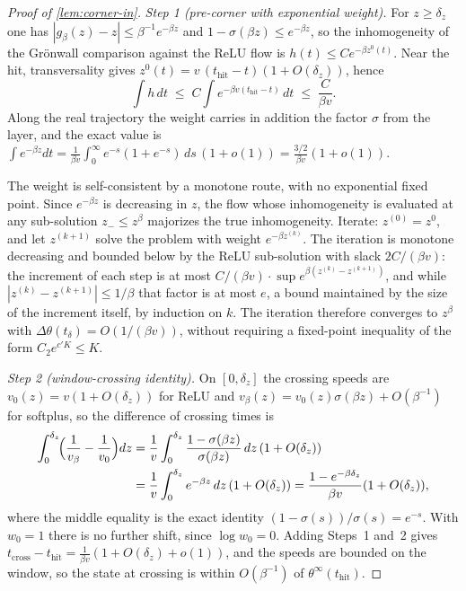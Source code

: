 \documentclass[11pt]{article}
\theoremstyle{definition}
\theoremstyle{remark}
\newcommand{\thit}{t_{\mathrm{hit}}}
\begin{document}
\begin{proof}[Proof of \cref{lem:corner-in}]
\emph{Step 1 (pre-corner with exponential weight).} For $z\ge\delta_z$ one has
$|g_\beta(z)-z|\le\beta^{-1}e^{-\beta z}$ and $1-\sigma(\beta z)\le e^{-\beta z}$,
so the inhomogeneity of the Gr\"onwall comparison against the ReLU flow is
$h(t)\le Ce^{-\beta z^0(t)}$. Near the hit, transversality gives
$z^0(t)=v\,(\thit-t)(1+O(\delta_z))$, hence
\[
\int h\,dt\;\le\;C\!\int e^{-\beta v(\thit-t)}\,dt\;\le\;\frac{C}{\beta v}.
\]
Along the real trajectory the weight carries in addition the factor $\sigma$ from
the layer, and the exact value is
$\int e^{-\beta z}dt=\tfrac{1}{\beta v}\int_0^\infty e^{-s}(1+e^{-s})\,ds\,(1+o(1))
=\tfrac{3/2}{\beta v}(1+o(1))$.

The weight is self-consistent by a monotone route, with no exponential fixed
point. Since $e^{-\beta z}$ is decreasing in $z$, the flow whose inhomogeneity is
evaluated at any sub-solution $z_-\le z^\beta$ majorizes the true inhomogeneity.
Iterate: $z^{(0)}=z^{0}$, and let $z^{(k+1)}$ solve the problem with weight
$e^{-\beta z^{(k)}}$. The iteration is monotone decreasing and bounded below by
the ReLU sub-solution with slack $2C/(\beta v)$: the increment of each step is at
most $C/(\beta v)\cdot\sup e^{\beta(z^{(k)}-z^{(k+1)})}$, and while
$|z^{(k)}-z^{(k+1)}|\le1/\beta$ that factor is at most $e$, a bound maintained by
the size of the increment itself, by induction on $k$. The iteration therefore
converges to $z^\beta$ with $\Delta\theta(t_\delta)=O(1/(\beta v))$, without
requiring a fixed-point inequality of the form $C_2e^{c'K}\le K$.

\emph{Step 2 (window-crossing identity).} On $[0,\delta_z]$ the crossing speeds
are $v_0(z)=v(1+O(\delta_z))$ for ReLU and
$v_\beta(z)=v_0(z)\sigma(\beta z)+O(\beta^{-1})$ for softplus, so the difference
of crossing times is
\begin{align*}
\int_0^{\delta_z}\!\Bigl(\frac{1}{v_\beta}-\frac{1}{v_0}\Bigr)dz
&=\frac{1}{v}\int_0^{\delta_z}\frac{1-\sigma(\beta z)}{\sigma(\beta
z)}\,dz\,(1+O(\delta_z))\\
&=\frac{1}{v}\int_0^{\delta_z}e^{-\beta z}\,dz\,(1+O(\delta_z))
=\frac{1-e^{-\beta\delta_z}}{\beta v}(1+O(\delta_z)),
\end{align*}
where the middle equality is the exact identity
$(1-\sigma(s))/\sigma(s)=e^{-s}$. With $w_0=1$ there is no further shift, since
$\log w_0=0$. Adding Steps~1 and~2 gives
$t_{\mathrm{cross}}-\thit=\tfrac{1}{\beta v}(1+O(\delta_z)+o(1))$, and the speeds
are bounded on the window, so the state at crossing is within $O(\beta^{-1})$ of
$\theta^\infty(\thit)$.
\end{proof}
\end{document}

